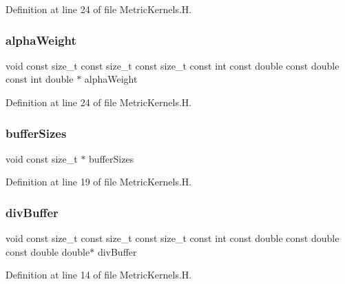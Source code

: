 Definition at line 24 of file Metric\+Kernels.\+H.

\hypertarget{MetricKernels_8H_a213b5d96b4acb2ec07edb3674e2ce0de}{}\label{MetricKernels_8H_a213b5d96b4acb2ec07edb3674e2ce0de} 
\subsubsection{\texorpdfstring{alpha\+Weight}{alphaWeight}}
{\footnotesize\ttfamily void const size\+\_\+t const size\+\_\+t const size\+\_\+t const int const double const double const int double $\ast$ alpha\+Weight}



Definition at line 24 of file Metric\+Kernels.\+H.

\hypertarget{MetricKernels_8H_af0ac147fcc3cf0ebf0ce192160b920b2}{}\label{MetricKernels_8H_af0ac147fcc3cf0ebf0ce192160b920b2} 
\subsubsection{\texorpdfstring{buffer\+Sizes}{bufferSizes}}
{\footnotesize\ttfamily void const size\+\_\+t $\ast$ buffer\+Sizes}



Definition at line 19 of file Metric\+Kernels.\+H.

\hypertarget{MetricKernels_8H_ae5c340d8d4218077e9f63a96aa442d93}{}\label{MetricKernels_8H_ae5c340d8d4218077e9f63a96aa442d93} 
\subsubsection{\texorpdfstring{div\+Buffer}{divBuffer}}
{\footnotesize\ttfamily void const size\+\_\+t const size\+\_\+t const size\+\_\+t const int const double const double const double double$\ast$ div\+Buffer}



Definition at line 14 of file Metric\+Kernels.\+H.

\hypertarget{MetricKernels_8H_ad7c998cbde26ccedfe008bbb660d59fe}{}\label{MetricKernels_8H_ad7c998cbde26ccedfe008bbb660d59fe} 

